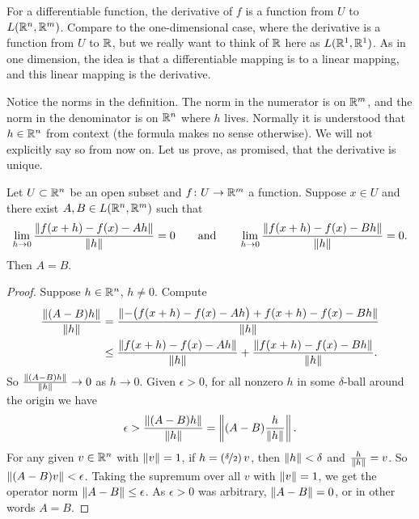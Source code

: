 For a differentiable function,
the derivative of $f$ is a function from $U$ to $L({\mathbb{R}}^n,{\mathbb{R}}^m)$.  Compare
to the one-dimensional case, where the derivative is a function
from $U$ to ${\mathbb{R}}$, but we really want to think of ${\mathbb{R}}$ here as
$L({\mathbb{R}}^1,{\mathbb{R}}^1)$.  As in one dimension, the idea is that a differentiable
mapping is  to a linear mapping, and this
linear mapping is the derivative.

Notice the norms in the definition.
The norm in the
numerator is on ${\mathbb{R}}^m$, and the norm in the denominator is on ${\mathbb{R}}^n$ where $h$
lives.
Normally it is understood that $h \in {\mathbb{R}}^n$ from context
(the formula makes no sense otherwise).
We will not explicitly say so from now on.
Let us prove, as promised, that the derivative is unique.


\begin{prop}
Let $U \subset {\mathbb{R}}^n$ be an open subset and $f \colon U \to {\mathbb{R}}^m$ a function.  Suppose
$x \in U$ and there exist 
$A,B \in L({\mathbb{R}}^n,{\mathbb{R}}^m)$ such that
\begin{equation*}
\lim_{h \to 0}
\frac{\lVert {f(x+h)-f(x) - Ah} \rVert}{\lVert {h} \rVert} = 0
\qquad \text{and} \qquad
\lim_{h \to 0}
\frac{\lVert {f(x+h)-f(x) - Bh} \rVert}{\lVert {h} \rVert} = 0 .
\end{equation*}
Then $A=B$.
\end{prop}

\begin{proof}
Suppose $h \in {\mathbb{R}}^n$, $h \not= 0$.  Compute
\begin{equation*}
\begin{split}
\frac{\lVert {(A-B)h} \rVert}{\lVert {h} \rVert} & =
\frac{\lVert {-\bigl(f(x+h)-f(x) - Ah\bigr) + f(x+h)-f(x) - Bh} \rVert}{\lVert {h} \rVert} \\
& \leq
\frac{\lVert {f(x+h)-f(x) - Ah} \rVert}{\lVert {h} \rVert} + \frac{\lVert {f(x+h)-f(x) -
Bh} \rVert}{\lVert {h} \rVert} .
\end{split}
\end{equation*}
So 
$\frac{\lVert {(A-B)h} \rVert}{\lVert {h} \rVert} \to 0$ as $h \to 0$.  Given
$\epsilon > 0$, for all nonzero $h$ in some $\delta$-ball around
the origin we have
\begin{equation*}
\epsilon > 
\frac{\lVert {(A-B)h} \rVert}{\lVert {h} \rVert}
=
\left\lVert {(A-B)\frac{h}{\lVert {h} \rVert}} \right\rVert .
\end{equation*}
For any given $v \in {\mathbb{R}}^n$ with $\lVert {v} \rVert=1$,
if $h = (\nicefrac{\delta}{2}) \, v$, then $\lVert {h} \rVert < \delta$
and $\frac{h}{\lVert {h} \rVert} = v$.
So $\lVert {(A-B)v} \rVert < \epsilon$.  Taking the supremum over all $v$ with
$\lVert {v} \rVert = 1$, we get the operator norm
$\lVert {A-B} \rVert \leq \epsilon$.  As $\epsilon > 0$
was arbitrary, $\lVert {A-B} \rVert = 0$, or in other words $A = B$.
\end{proof}

